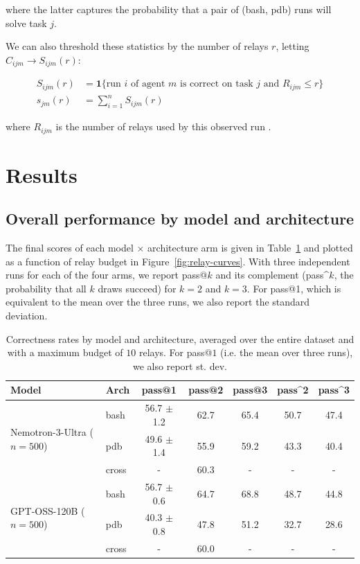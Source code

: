 \documentclass{article}
\begin{document}
where the latter captures the probability that a pair of (bash, pdb) runs will solve task $j$.


We can also threshold these statistics by the number of relays $r$, letting $C_{ijm} \rightarrow S_{ijm}(r)$:

\begin{align}
S_{ijm}(r) &= \mathbf{1} \{ \text{run } i \text{ of agent } m \text{ is correct on task } j \text{ and } R_{ijm} \leq r \}
\label{eq:eqn_6} \\
s_{jm}(r) &= \sum_{i=1}^n S_{ijm}(r)
\label{eq:eqn_7}
\end{align}

where $R_{ijm}$ is the number of relays used by this observed run \cite{zhai2026doesrlexpandcapability}.

\section{Results}


\subsection{Overall performance by model and architecture}
\label{sec:performance}

The final scores of each model $\times$ architecture arm is given in Table~\ref{tab:main} and plotted as a function of relay budget in Figure~\ref{fig:relay-curves}. With three independent runs for each of the four arms, we report pass@$k$ and its complement (pass\^{}$k$, the probability that all $k$ draws succeed) for $k=2$ and $k=3$. For pass@1, which is equivalent to the mean over the three runs, we also report the standard deviation.

\begin{table}[h!]
  \caption{Correctness rates by model and architecture, averaged over the entire dataset and with a maximum budget of $10$ relays. For pass@$1$ (i.e. the mean over three runs), we also report st. dev.}
  \label{tab:main}
  \centering
  \small
  \begin{tabular}{llccccc}
    \toprule
    \textbf{Model} & \textbf{Arch} & \textbf{pass@1}
      & \textbf{pass@2} &  \textbf{pass@3} & \textbf{pass\^{}2} & \textbf{pass\^{}3} \\
    \midrule
    \multirow{3}{*}{Nemotron-3-Ultra ($n{=}500$)}
        & bash & 56.7 $\pm$ 1.2 & 62.7 & 65.4 & 50.7 & 47.4 \\
        & pdb  & 49.6 $\pm$ 1.4 & 55.9 & 59.2 & 43.3 & 40.4 \\
        & cross & - & 60.3 & - & - & - \\
      \midrule
      \multirow{3}{*}{GPT-OSS-120B ($n{=}500$)}
        & bash & 56.7 $\pm$ 0.6 & 64.7 & 68.8 & 48.7 & 44.8 \\
        & pdb  & 40.3 $\pm$ 0.8 & 47.8 & 51.2 & 32.7 & 28.6 \\
        & cross & - & 60.0 & - & - & - \\
      \bottomrule
  \end{tabular}
\end{table}
\end{document}
